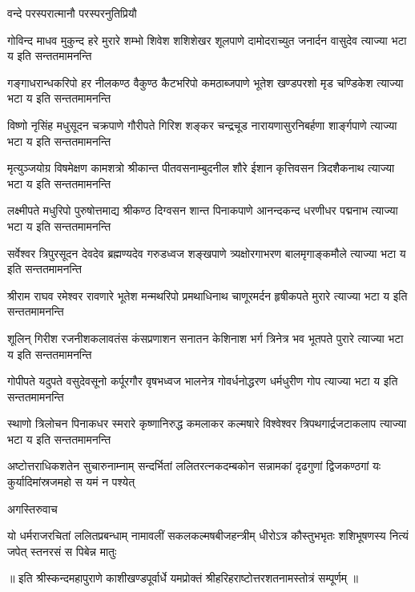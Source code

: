 
{वन्दे परस्परात्मानौ परस्परनुतिप्रियौ}

\fourlineindentedshloka
{गोविन्द माधव मुकुन्द हरे मुरारे}
{शम्भो शिवेश शशिशेखर शूलपाणे}
{दामोदराच्युत जनार्दन वासुदेव}
{त्याज्या भटा य इति सन्ततमामनन्ति}

\fourlineindentedshloka
{गङ्गाधरान्धकरिपो हर नीलकण्ठ}
{वैकुण्ठ कैटभरिपो कमठाब्जपाणे}
{भूतेश खण्डपरशो मृड चण्डिकेश}
{त्याज्या भटा य इति सन्ततमामनन्ति}

\fourlineindentedshloka
{विष्णो नृसिंह मधुसूदन चक्रपाणे}
{गौरीपते गिरिश शङ्कर चन्द्रचूड}
{नारायणासुरनिबर्हणा शार्ङ्गपाणे}
{त्याज्या भटा य इति सन्ततमामनन्ति}

\fourlineindentedshloka
{मृत्युञ्जयोग्र विषमेक्षण कामशत्रो}
{श्रीकान्त पीतवसनाम्बुदनील शौरे}
{ईशान कृत्तिवसन त्रिदशैकनाथ}
{त्याज्या भटा य इति सन्ततमामनन्ति}

\fourlineindentedshloka
{लक्ष्मीपते मधुरिपो पुरुषोत्तमाद्य}
{श्रीकण्ठ दिग्वसन शान्त पिनाकपाणे}
{आनन्दकन्द धरणीधर पद्मनाभ}
{त्याज्या भटा य इति सन्ततमामनन्ति}

\fourlineindentedshloka
{सर्वेश्वर त्रिपुरसूदन देवदेव}
{ब्रह्मण्यदेव गरुडध्वज शङ्खपाणे}
{त्र्यक्षोरगाभरण बालमृगाङ्कमौले}
{त्याज्या भटा य इति सन्ततमामनन्ति}

\fourlineindentedshloka
{श्रीराम राघव रमेश्वर रावणारे}
{भूतेश मन्मथरिपो प्रमथाधिनाथ}
{चाणूरमर्दन हृषीकपते मुरारे}
{त्याज्या भटा य इति सन्ततमामनन्ति}

\fourlineindentedshloka
{शूलिन् गिरीश रजनीशकलावतंस}
{कंसप्रणाशन सनातन केशिनाश}
{भर्ग त्रिनेत्र भव भूतपते पुरारे}
{त्याज्या भटा य इति सन्ततमामनन्ति}

\fourlineindentedshloka
{गोपीपते यदुपते वसुदेवसूनो}
{कर्पूरगौर वृषभध्वज भालनेत्र}
{गोवर्धनोद्धरण धर्मधुरीण गोप}
{त्याज्या भटा य इति सन्ततमामनन्ति}

\fourlineindentedshloka
{स्थाणो त्रिलोचन पिनाकधर स्मरारे}
{कृष्णानिरुद्ध कमलाकर कल्मषारे}
{विश्वेश्वर त्रिपथगार्द्रजटाकलाप}
{त्याज्या भटा य इति सन्ततमामनन्ति}

\fourlineindentedshloka
{अष्टोत्तराधिकशतेन सुचारुनाम्नाम्}
{सन्दर्भितां ललितरत्नकदम्बकोन}
{सन्नामकां दृढगुणां द्विजकण्ठगां यः}
{कुर्यादिमांस्रजमहो स यमं न पश्येत्}

{अगस्तिरुवाच}

\fourlineindentedshloka
{यो धर्मराजरचितां ललितप्रबन्धाम्}
{नामावलीं सकलकल्मषबीजहन्त्रीम्}
{धीरोऽत्र कौस्तुभभृतः शशिभूषणस्य}
{नित्यं जपेत् स्तनरसं स पिबेन्न मातुः}

{॥ इति श्रीस्कन्दमहापुराणे काशीखण्डपूर्वार्धे यमप्रोक्तं श्रीहरिहराष्टोत्तरशतनामस्तोत्रं सम्पूर्णम् ॥}